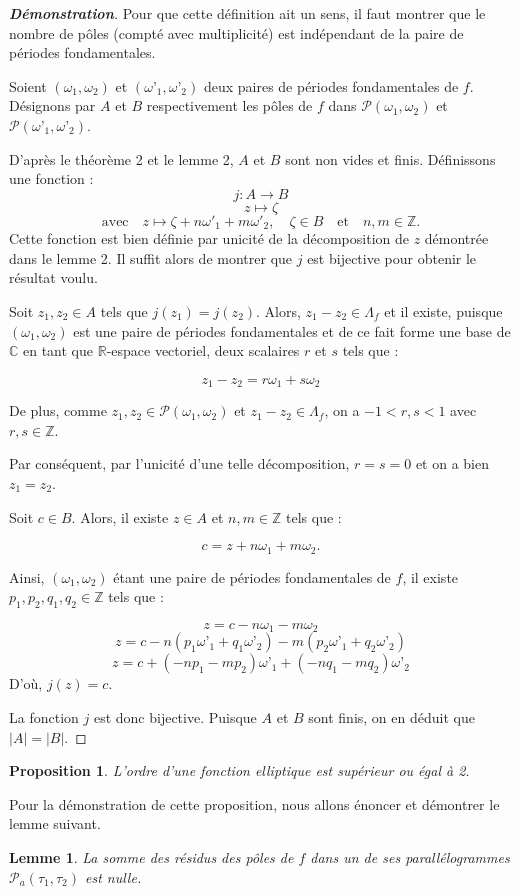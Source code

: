 \documentclass[12pt]{article}
\newtheorem{lemma}{Lemme}
\newtheorem{proposition}{Proposition}
\begin{document}
\begin{proof}[\textbf{Démonstration}]

Pour que cette définition ait un sens, il faut montrer que le nombre de pôles (compté avec multiplicité) est indépendant de la paire de périodes fondamentales.

Soient $(\omega_1, \omega_2)$ et $(\omega’_1, \omega’_2)$ deux paires de périodes fondamentales de $f$. Désignons par $A$ et $B$ respectivement les pôles de $f$ dans $\mathcal{P}(\omega_1, \omega_2)$ et $\mathcal{P}(\omega’_1, \omega’_2)$.

D’après le théorème 2 et le lemme 2, $A$ et $B$ sont non vides et finis. Définissons une fonction :
\[
j: A \rightarrow B
\]
\[
z \mapsto \zeta
\]
\[
    \text{avec} \quad z \mapsto \zeta + n\omega'_1 + m\omega'_2, \quad \zeta \in B \quad \text{et} \quad n,m \in \mathbb{Z}.
    \]
Cette fonction est bien définie par unicité de la décomposition de $z$ démontrée dans le lemme 2. Il suffit alors de montrer que $j$ est bijective pour obtenir le résultat voulu.

Soit $z_1, z_2 \in A$ tels que $j(z_1) = j(z_2)$. Alors, $z_1 - z_2 \in \Lambda_f$ et il existe, puisque $(\omega_1, \omega_2)$ est une paire de périodes fondamentales et de ce fait forme une base de $\mathbb{C}$ en tant que $\mathbb{R}$-espace vectoriel, deux scalaires $r$ et $s$ tels que :

\[ z_1 - z_2 = r\omega_1 + s\omega_2 \]

De plus, comme $z_1, z_2 \in \mathcal{P}(\omega_1, \omega_2)$ et $z_1 - z_2 \in \Lambda_f$, on a $-1 < r, s < 1$ avec $r, s \in \mathbb{Z}$.

Par conséquent, par l’unicité d’une telle décomposition, $r = s = 0$ et on a bien $z_1 = z_2$.

Soit $c \in B$. Alors, il existe $z \in A$ et $n, m \in \mathbb{Z}$ tels que :

\[ c = z + n\omega_1 + m\omega_2.\]

Ainsi, $(\omega_1, \omega_2)$ étant une paire de périodes fondamentales de $f$, il existe $p_1, p_2, q_1, q_2 \in \mathbb{Z}$ tels que :

\[ z = c -n \omega_1 - m \omega_2\]
\[ z = c - n(p_1\omega’_1 + q_1\omega’_2) - m(p_2\omega’_1 + q_2\omega’_2) \]
\[ z =  c + (-n p_1 - m p_2)\omega’_1 + (-n q_1 - m q_2)\omega’_2 \]
D’où, $j(z) = c$.

La fonction $j$ est donc bijective. Puisque $A$ et $B$ sont finis, on en déduit que $|A| = |B|$.
\end{proof}
\begin{proposition}
    L'ordre d'une fonction elliptique est supérieur ou égal à 2.
    \end{proposition}
    Pour la démonstration de cette proposition, nous allons énoncer et démontrer le lemme suivant.
    \begin{lemma}
    La somme des résidus des pôles de \( f \) dans un de ses parallélogrammes \( \mathcal{P}_a(\tau_1,\tau_2) \) est nulle.
    \end{lemma}
\end{document}
